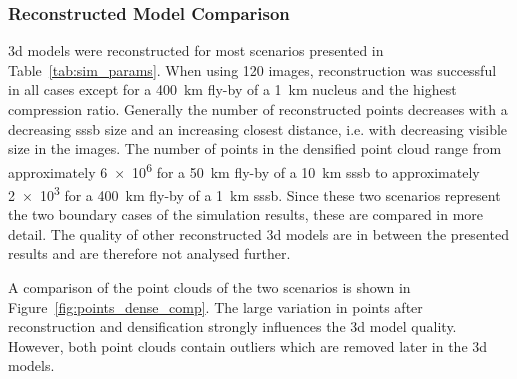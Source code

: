 \subsubsection{Reconstructed Model Comparison}
\Gls{3d} models were reconstructed for most scenarios presented in Table~\ref{tab:sim_params}. When using \SI{120}{} images, reconstruction was successful in all cases except for a \SI{400}{\kilo\meter} fly-by of a \SI{1}{\kilo\meter} nucleus and the highest compression ratio. Generally the number of reconstructed points decreases with a decreasing \gls{sssb} size and an increasing closest distance, i.e. with decreasing visible size in the images.
The number of points in the densified point cloud range from approximately \SI{6e6}{} for a \SI{50}{\kilo\meter} fly-by of a \SI{10}{\kilo\meter} \gls{sssb} to approximately \SI{2e3}{} for a \SI{400}{\kilo\meter} fly-by of a \SI{1}{\kilo\meter} \gls{sssb}. Since these two scenarios represent the two boundary cases of the simulation results, these are compared in more detail. The quality of other reconstructed \gls{3d} models are in between the presented results and are therefore not analysed further.

A comparison of the point clouds of the two scenarios is shown in Figure~\ref{fig:points_dense_comp}. The large variation in points after reconstruction and densification strongly influences the \gls{3d} model quality. However, both point clouds contain outliers which are removed later in the \gls{3d} models.

